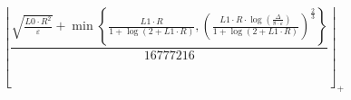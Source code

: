 \[\left\lfloor \frac{\sqrt{\frac{L0 \cdot R^{2}}{\varepsilon}} + \min\left\{ \frac{L1 \cdot R}{1 + \log\left(2 + L1 \cdot R\right)}, \left(\frac{L1 \cdot R \cdot \log\left(\frac{\Delta}{8 \cdot \varepsilon}\right)}{1 + \log\left(2 + L1 \cdot R\right)}\right)^{\frac{2}{3}} \right\}}{16777216} \right\rfloor_{+}\]
